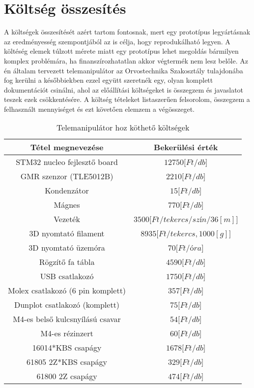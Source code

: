 \chapter{Költség összesítés}
\label{sec:kolt_elem}

A költségek összesítését azért tartom fontosnak, mert egy prototípus legyártásnak az eredményesség szempontjából az is célja, hogy reprodukálható legyen. A költéség elemek túlzott mérete miatt egy prototípus lehet megoldás bármilyen komplex problémára, ha finanszírozhatatlan akkor végtermék nem lesz belőle. Az én általam tervezett telemanipulátor az Orvostechnika Szakosztály tulajdonába fog kerülni a későbbiekben ezzel együtt szeretnék egy, olyan komplett dokumentációt csinálni, ahol az előállítási költségeket is összegzem és javaslatot teszek ezek csökkentésére. A költség tételeket listaszerűen felsorolom, összegzem a felhasznált mennyiséget és ezt követően elemzem a végösszeget.

\begin{table}[!ht]
\centering
\begin{tabular}{ |c|c| }
 \hline
 Tétel megnevezése & Bekerülési érték  \\
 \hline
   \hline
 STM32 nucleo fejlesztő board & $12750[Ft$/$db]$  \\
 \hline
 GMR szenzor (TLE5012B) & $2210[Ft$/$db]$  \\
 \hline
 Kondenzátor & $15[Ft$/$db]$  \\
 \hline
 Mágnes & $770[Ft$/$db]$  \\
 \hline
 Vezeték & $3500[Ft$/$tekercs$/$szín$/$36[m]]$  \\
 \hline
 3D nyomtató filament & $8935[Ft$/$tekercs,1000[g]]$  \\
 \hline
 3D nyomtató üzemóra & $70[Ft$/$óra]$ \\
 \hline
 Rögzítő fa tábla & $4590[Ft$/$db]$  \\
 \hline
 USB csatlakozó & $1750[Ft$/$db]$  \\
 \hline
 Molex csatlakozó (6 pin komplett) & $357[Ft$/$db]$  \\  
 \hline
 Dunplot csatlakozó (komplett) & $75[Ft$/$db]$  \\
 \hline
 M4-es belső kulcsnyílású csavar & $54[Ft$/$db]$  \\
 \hline
 M4-es rézinzert & $60[Ft$/$db]$  \\
 \hline
 16014*KBS csapágy & $1678[Ft$/$db]$  \\
 \hline
 61805 2Z*KBS csapágy & $329[Ft$/$db]$  \\
 \hline
 61800 2Z csapágy & $474[Ft$/$db]$  \\
\hline
\end{tabular}
\caption{Telemanipulátor hoz köthető költségek}
\label{table:Koltsegek}
\end{table}


